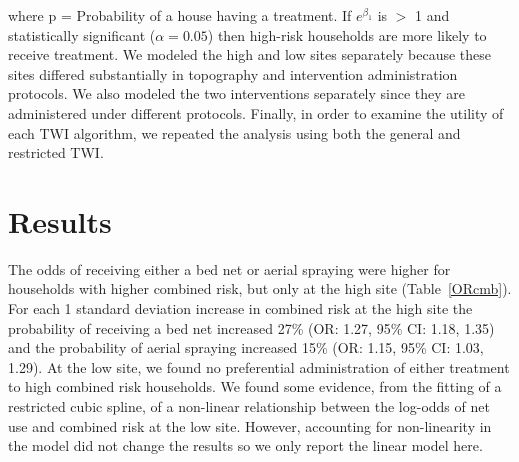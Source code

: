 \documentclass[10pt,letterpaper]{article}\usepackage[]{graphicx}\usepackage[]{color}
\begin{document}
{where p  =  Probability of a house having a treatment.  If $e^{\beta_1}$ is $>$ 1 and statistically significant ($\alpha = 0.05$) then high-risk households are more likely to receive treatment.  %
We modeled the high and low sites separately because these sites differed substantially in topography and intervention administration protocols.  We also modeled the two interventions separately since they are administered under different protocols.  Finally, in order to examine the utility of each TWI algorithm, we repeated the analysis using both the general and restricted TWI.\\  %




























\section*{Results}
The odds of receiving either a bed net or aerial spraying were higher for households with higher combined risk,  but only at the high site (Table~\ref{ORcmb}).  For each 1 standard deviation increase in combined risk at the high site the probability of receiving a bed net increased 27\% (OR: 1.27,  95\% CI: 1.18,  1.35) and the probability of aerial spraying increased 15\% (OR: 1.15,  95\% CI: 1.03,  1.29).  At the low site,  we found no preferential administration of either treatment to high combined risk households.  We found some evidence,  from the fitting of a restricted cubic spline,  of a non-linear relationship between the log-odds of net use and combined risk at the low site.  However,  accounting for non-linearity in the model did not change the results so we only report the linear model here.\\ 



}
\end{document}
